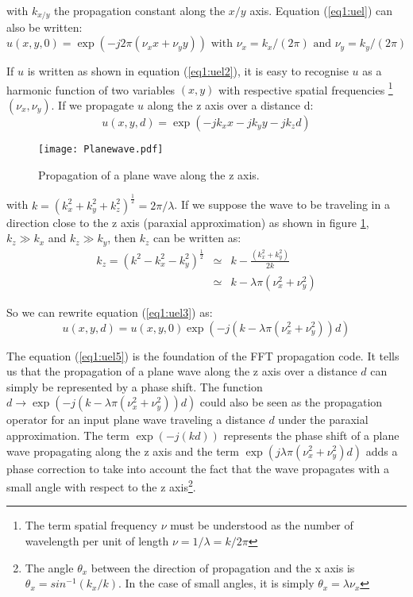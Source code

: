 \noindent with $k_{x/y}$ the propagation constant along the $x/y$ axis. Equation (\ref{eq1:uel}) can also be written:
\begin{equation}
u(x,y,0) = \exp(-j 2 \pi (\nu_x x + \nu_y y)) \mbox{ with } \nu_x = k_x/(2 \pi) \mbox{ and } \nu_y = k_y/(2 \pi)
\label{eq1:uel2}
\end{equation}

If $u$ is written as shown in equation (\ref{eq1:uel2}), it is easy to recognise $u$ as a harmonic function of two variables $(x,y)$ with respective spatial frequencies \footnote{The term spatial frequency $\nu$ must be understood as the number of wavelength per unit of length $\nu = 1/\lambda = k / 2\pi$} $(\nu_x,\nu_y)$. If we propagate $u$ along the z axis over a distance d:
\begin{equation}
u(x,y,d) = \exp(-j k_x x - j k_y y - j k_z d)
\label{eq1:uel3}
\end{equation}

\begin{figure}
\begin{center}
\texttt{[image: Planewave.pdf]}
\end{center}
\caption{\label{fig1:plane} Propagation of a plane wave along the z axis.}
\end{figure}


\noindent with $k =  (k_x^2 + k_y^2 + k_z^2)^{\frac{1}{2}} = 2 \pi / \lambda $. If we suppose the wave to be traveling in a direction close to the z axis (paraxial approximation) as shown in figure \ref{fig1:plane}, $k_z \gg k_x$ and $k_z \gg k_y$, then $k_z$ can be written as:
\begin{eqnarray}
k_z = (k^2 - k_x^2 - k_y^2)^{\frac{1}{2}} & \simeq & k - \frac{(k_x^2 + k_y^2)}{2 k } \label{eq4:uel4a}\\
& \simeq & k - \lambda \pi (\nu_x^2 + \nu_y^2)
\label{eq1:uel4}
\end{eqnarray}

\noindent So we can rewrite equation (\ref{eq1:uel3}) as:
\begin{equation}
u(x,y,d) = u(x,y,0) \exp(-j (k - \lambda \pi (\nu_x^2 + \nu_y^2))d)
\label{eq1:uel5}
\end{equation}

The equation (\ref{eq1:uel5}) is the foundation of the FFT propagation code. It tells us that the propagation of a plane wave along the z axis over a distance $d$ can simply be represented by a phase shift. The function $ d\rightarrow \exp(-j (k - \lambda \pi (\nu_x^2 + \nu_y^2))d)$ could also be seen as the propagation operator for an input plane wave traveling a distance $d$ under the paraxial approximation. The term $\exp(-j (k d))$ represents the phase shift of a plane wave propagating along the z axis and the term $ \exp (j \lambda \pi (\nu_x^2 + \nu_y^2)d)$ adds a phase correction to take into account the fact that the wave propagates with a small angle with respect to the z axis\footnote{The angle $\theta_x$ between the direction of propagation and the x axis is $\theta_x = sin^{-1}(k_x/k)$. In the case of small angles, it is simply $\theta_x = \lambda \nu_x$}.\\


